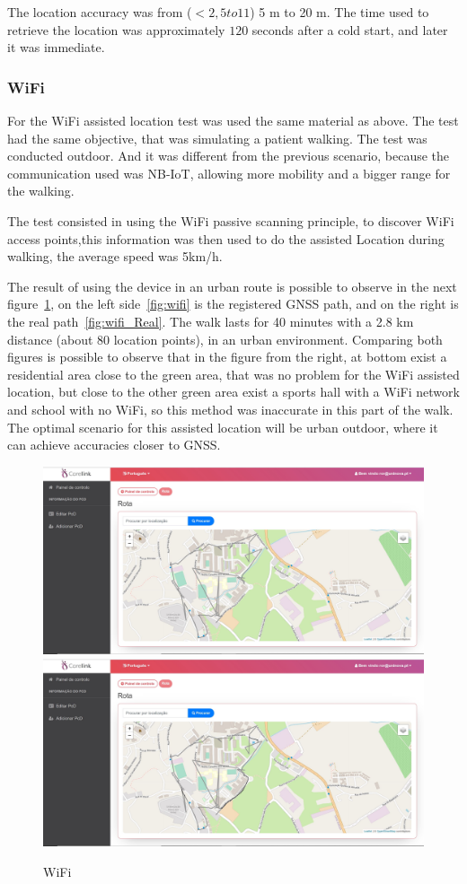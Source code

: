 The location accuracy was from ($<2,5 to 11$) 5 m to 20 m. The time used to retrieve the location was approximately $120$ seconds after a cold start, and later it was immediate.

\subsubsection{WiFi}
\label{subsubsec:WiFi}
For the WiFi assisted location test was used the same material as above. The test had the same objective, that was simulating a patient walking. The test was conducted outdoor. And it was different from the previous scenario, because the communication used  was NB-IoT, allowing more mobility and a bigger range for the walking.

The test consisted in using the WiFi passive scanning principle, to discover WiFi access points,this information was then used to do the  assisted Location during walking, the average speed was 5km/h. 

The result of using the device in an urban route is possible to observe in the next figure~\ref{fig:WiFi_Results}, on the left side~\ref{fig:wifi} is the registered GNSS path, and on the right is the real path~\ref{fig:wifi_Real}.  The walk lasts for 40 minutes with a 2.8 km distance (about 80 location points), in an urban environment. Comparing both figures is possible to observe that in the figure from the right, at bottom exist a residential area close to the green area, that was no problem for the WiFi assisted location, but  close to the other green area exist a sports hall with a WiFi network and school with no WiFi, so this method was inaccurate in this part of the walk. The optimal scenario for this assisted location will be urban outdoor, where it can achieve accuracies closer to GNSS.

\begin{figure}[htbp]
  \centering
    {\includegraphics[width=0.5\linewidth]{Chapters/Figures/wifi.JPG}}%
    {\includegraphics[width=0.5\linewidth]{Chapters/Figures/wifireal.JPG}}%
  \caption{WiFi }
  \label{fig:WiFi_Results}
\end{figure}

